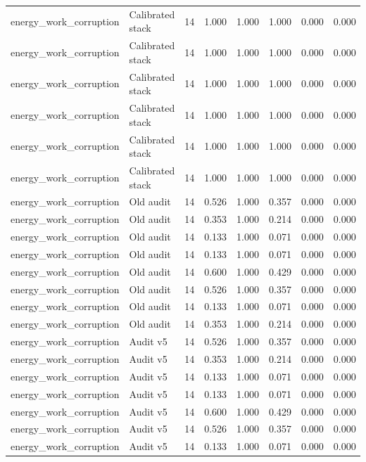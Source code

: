 {\begin{longtable}{llrrrrrr}
energy\_work\_corruption & Calibrated stack & 14 & 1.000 & 1.000 & 1.000 & 0.000 & 0.000 \\
energy\_work\_corruption & Calibrated stack & 14 & 1.000 & 1.000 & 1.000 & 0.000 & 0.000 \\
energy\_work\_corruption & Calibrated stack & 14 & 1.000 & 1.000 & 1.000 & 0.000 & 0.000 \\
energy\_work\_corruption & Calibrated stack & 14 & 1.000 & 1.000 & 1.000 & 0.000 & 0.000 \\
energy\_work\_corruption & Calibrated stack & 14 & 1.000 & 1.000 & 1.000 & 0.000 & 0.000 \\
energy\_work\_corruption & Calibrated stack & 14 & 1.000 & 1.000 & 1.000 & 0.000 & 0.000 \\
energy\_work\_corruption & Old audit & 14 & 0.526 & 1.000 & 0.357 & 0.000 & 0.000 \\
energy\_work\_corruption & Old audit & 14 & 0.353 & 1.000 & 0.214 & 0.000 & 0.000 \\
energy\_work\_corruption & Old audit & 14 & 0.133 & 1.000 & 0.071 & 0.000 & 0.000 \\
energy\_work\_corruption & Old audit & 14 & 0.133 & 1.000 & 0.071 & 0.000 & 0.000 \\
energy\_work\_corruption & Old audit & 14 & 0.600 & 1.000 & 0.429 & 0.000 & 0.000 \\
energy\_work\_corruption & Old audit & 14 & 0.526 & 1.000 & 0.357 & 0.000 & 0.000 \\
energy\_work\_corruption & Old audit & 14 & 0.133 & 1.000 & 0.071 & 0.000 & 0.000 \\
energy\_work\_corruption & Old audit & 14 & 0.353 & 1.000 & 0.214 & 0.000 & 0.000 \\
energy\_work\_corruption & Audit v5 & 14 & 0.526 & 1.000 & 0.357 & 0.000 & 0.000 \\
energy\_work\_corruption & Audit v5 & 14 & 0.353 & 1.000 & 0.214 & 0.000 & 0.000 \\
energy\_work\_corruption & Audit v5 & 14 & 0.133 & 1.000 & 0.071 & 0.000 & 0.000 \\
energy\_work\_corruption & Audit v5 & 14 & 0.133 & 1.000 & 0.071 & 0.000 & 0.000 \\
energy\_work\_corruption & Audit v5 & 14 & 0.600 & 1.000 & 0.429 & 0.000 & 0.000 \\
energy\_work\_corruption & Audit v5 & 14 & 0.526 & 1.000 & 0.357 & 0.000 & 0.000 \\
energy\_work\_corruption & Audit v5 & 14 & 0.133 & 1.000 & 0.071 & 0.000 & 0.000 \\

\end{longtable}}
